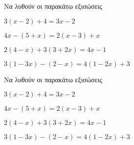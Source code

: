 Να λυθούν οι παρακάτω εξισώσεις
\begin{rlist}
\item $ 3(x-2)+4=3x-2 $
\item $ 4x-(5+x)=2(x-3)+x $
\item $ 2(4-x)+3(3+2x)=4x-1 $
\item $ 3(1-3x)-(2-x)=4(1-2x)+3 $
\end{rlist}
Να λυθούν οι παρακάτω εξισώσεις
\begin{rlist}
\item $ 3(x-2)+4=3x-2 $
\item $ 4x-(5+x)=2(x-3)+x $
\item $ 2(4-x)+3(3+2x)=4x-1 $
\item $ 3(1-3x)-(2-x)=4(1-2x)+3 $
\end{rlist}
